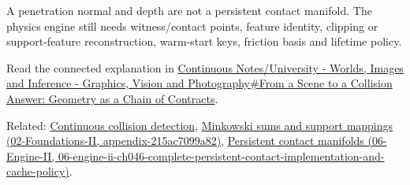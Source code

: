 A penetration normal and depth are not a persistent contact manifold. The physics engine still needs witness/contact points, feature identity, clipping or support-feature reconstruction, warm-start keys, friction basis and lifetime policy.

Read the connected explanation in \hyperref[03-visual-computing-i-ch020-from-a-scene-to-a-collision-answer-geometry-as-a-chain-of-contracts]{Continuous Notes/University - Worlds, Images and Inference - Graphics, Vision and Photography\#From a Scene to a Collision Answer: Geometry as a Chain of Contracts}.

Related: \hyperref[appendix-66956ed6c753]{Continuous collision detection}, \href{../02-Foundations-II/main.pdf\#nameddest=appendix-215ac7099a82}{Minkowski sums and support mappings (02-Foundations-II, appendix-215ac7099a82)}, \href{../06-Engine-II/main.pdf\#nameddest=06-engine-ii-ch046-complete-persistent-contact-implementation-and-cache-policy}{Persistent contact manifolds (06-Engine-II, 06-engine-ii-ch046-complete-persistent-contact-implementation-and-cache-policy)}.
